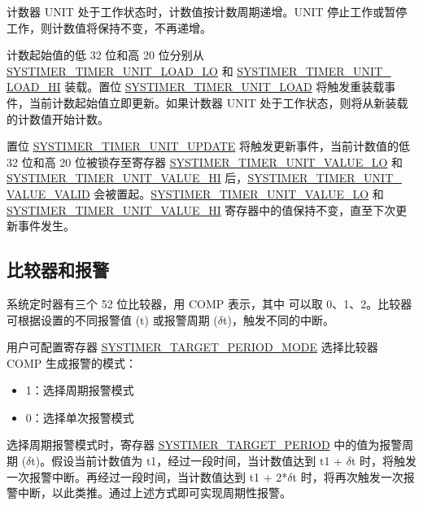 \documentclass[main\_\_CN.tex]{subfiles}
\begin{document}
计数器 UNIT 处于工作状态时，计数值按计数周期递增。UNIT 停止工作或暂停工作，则计数值将保持不变，不再递增。

计数起始值的低 32 位和高 20 位分别从 \hyperref[fielddesc:SYSTIMERTIMERUNIT0LOADLO]{SYSTIMER\_TIMER\_UNIT\_LOAD\_LO} 和 \hyperref[fielddesc:SYSTIMERTIMERUNIT0LOADHI]{SYSTIMER\_TIMER\_UNIT\_\\LOAD\_HI} 装载。置位 \hyperref[fielddesc:SYSTIMERTIMERUNIT0LOAD]{SYSTIMER\_TIMER\_UNIT\_LOAD} 将触发重装载事件，当前计数起始值立即更新。如果计数器 UNIT 处于工作状态，则将从新装载的计数值开始计数。

置位 \hyperref[fielddesc:SYSTIMERTIMERUNIT0UPDATE]{SYSTIMER\_TIMER\_UNIT\_UPDATE} 将触发更新事件，当前计数值的低 32 位和高 20 位被锁存至寄存器 \hyperref[fielddesc:SYSTIMERTIMERUNIT0VALUELO]{SYSTIMER\_TIMER\_UNIT\_VALUE\_LO} 和 \hyperref[fielddesc:SYSTIMERTIMERUNIT0VALUEHI]{SYSTIMER\_TIMER\_UNIT\_VALUE\_HI} 后，\hyperref[fielddesc:SYSTIMERTIMERUNIT0VALUEVALID]{SYSTIMER\_TIMER\_UNIT\_\\VALUE\_VALID} 会被置起。\hyperref[fielddesc:SYSTIMERTIMERUNIT0VALUELO]{SYSTIMER\_TIMER\_UNIT\_VALUE\_LO} 和 \hyperref[fielddesc:SYSTIMERTIMERUNIT0VALUEHI]{SYSTIMER\_TIMER\_UNIT\_VALUE\_HI} 寄存器中的值保持不变，直至下次更新事件发生。


\subsection{比较器和报警}
系统定时器有三个 52 位比较器，用 COMP 表示，其中  可以取 0、1、2。比较器可根据设置的不同报警值 (t) 或报警周期 ($\delta$t)，触发不同的中断。

用户可配置寄存器 \hyperref[fielddesc:SYSTIMERTARGET0PERIODMODE]{SYSTIMER\_TARGET\_PERIOD\_MODE} 选择比较器 COMP 生成报警的模式：
\begin{itemize}
    \item 1：选择周期报警模式
    \item 0：选择单次报警模式
\end{itemize}

选择周期报警模式时，寄存器 \hyperref[fielddesc:SYSTIMERTARGET2PERIOD]{SYSTIMER\_TARGET\_PERIOD} 中的值为报警周期 ($\delta$t)。假设当前计数值为 t1，经过一段时间，当计数值达到 t1 + $\delta$t 时，将触发一次报警中断。再经过一段时间，当计数值达到 t1 + 2*$\delta$t 时，将再次触发一次报警中断，以此类推。通过上述方式即可实现周期性报警。
\end{document}
